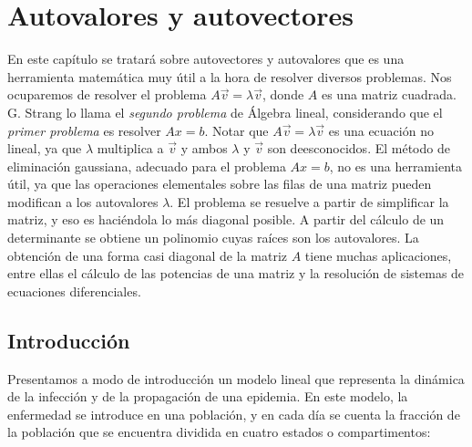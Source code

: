 

\chapter{Autovalores y autovectores}
En este capítulo   se tratará sobre autovectores y autovalores que es una herramienta matemática muy útil a la hora de resolver diversos problemas. Nos ocuparemos de resolver el problema $A \vec{v}=\lambda \vec{v}$, donde $A$ es una matriz cuadrada. G. Strang \cite{strang} lo llama el \textit{segundo problema} de Álgebra lineal, considerando que el \textit{primer problema}  es resolver $Ax=b$. Notar que $A\vec{v}=\lambda \vec{v}$ es una ecuación no lineal, ya que $\lambda$ multiplica a $\vec{v}$ y ambos $\lambda$ y $\vec{v}$ son deesconocidos. El método de eliminación gaussiana,    adecuado   para el problema $Ax=b$, no es  una herramienta útil, ya que  las operaciones elementales sobre las filas de una matriz pueden  modifican a los autovalores $\lambda$. El problema  se resuelve  a partir de simplificar la matriz, y eso es haciéndola lo más diagonal posible. A partir  del cálculo de un determinante se obtiene un polinomio cuyas raíces son los autovalores.
La obtención de una forma casi diagonal de la matriz $A$ tiene muchas aplicaciones, entre ellas el cálculo de las potencias de una matriz y la resolución de sistemas de ecuaciones diferenciales.


\lstset{language=Matlab, breaklines=true, basicstyle=\footnotesize}


\bigskip

\section{Introducción}
\label{programa}

Presentamos  a modo de introducción  un modelo lineal que representa   la dinámica de la infección y de la propagación de una epidemia.  En este modelo, la enfermedad se introduce en una población, y en cada día se cuenta la fracción de la población que se encuentra dividida en cuatro estados o compartimentos:

